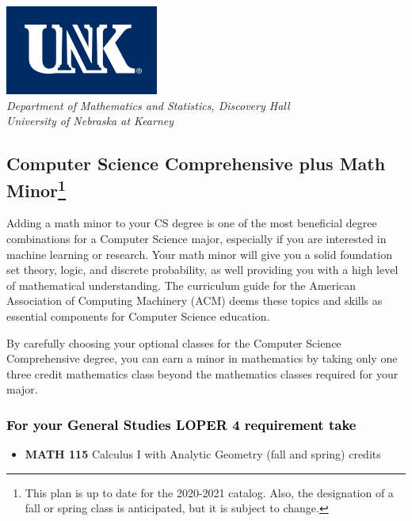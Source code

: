 \documentclass[9pt]{article}
\begin{document}
\begin{flushleft}
\includegraphics[scale=0.25]{unk-logo}\\
 \emph{\textcolor{unkblue}{Department of Mathematics and Statistics, Discovery Hall}} \\
  \emph{\textcolor{unkblue}{University of Nebraska at Kearney}}
\end{flushleft}


\subsection*{\textbf{\textcolor{unkblue}{Computer Science Comprehensive plus Math Minor\footnote[1]{This plan is up to date for the 2020-2021 catalog. Also, the designation of a fall or spring class is anticipated, but it is subject to change.
}}}}


Adding a math minor to your CS degree is one of the most beneficial degree combinations for a Computer Science major, especially if you are interested in machine learning or research.  Your math minor will give you a solid foundation set theory, logic, and discrete probability, as well providing you with a high level of mathematical understanding.
The curriculum guide for the American Association of Computing Machinery (ACM) deems  these topics and skills  as essential components for  Computer Science education.

By carefully choosing your optional classes for the Computer Science Comprehensive degree, you can earn a minor in mathematics by taking only one three credit mathematics class beyond
the mathematics classes required for your major.

\subsubsection*{\textcolor{black}{For  your General Studies LOPER 4 requirement take}}
\begin{itemize}
\item \textbf{MATH 115} Calculus I with Analytic Geometry (fall and spring)  credits
\end{itemize}
\end{document}
